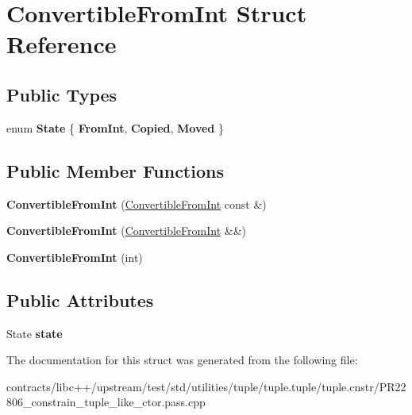 \hypertarget{struct_convertible_from_int}{}\section{Convertible\+From\+Int Struct Reference}
\label{struct_convertible_from_int}
\subsection*{Public Types}
\begin{DoxyCompactItemize}
\item 
\mbox{\label{struct_convertible_from_int_ac03fea24f2e5f41801003b27b999393c}} 
enum {\bfseries State} \{ {\bfseries From\+Int}, 
{\bfseries Copied}, 
{\bfseries Moved}
 \}
\end{DoxyCompactItemize}
\subsection*{Public Member Functions}
\begin{DoxyCompactItemize}
\item 
\mbox{\label{struct_convertible_from_int_a1fb13d3ae68c396a825090457729cc38}} 
{\bfseries Convertible\+From\+Int} (\mbox{\hyperlink{struct_convertible_from_int}{Convertible\+From\+Int}} const \&)
\item 
\mbox{\label{struct_convertible_from_int_a76fd3a33529e22331a478ac56dc66cfd}} 
{\bfseries Convertible\+From\+Int} (\mbox{\hyperlink{struct_convertible_from_int}{Convertible\+From\+Int}} \&\&)
\item 
\mbox{\label{struct_convertible_from_int_a15b206abf4ddc0338da9c98ed37e9743}} 
{\bfseries Convertible\+From\+Int} (int)
\end{DoxyCompactItemize}
\subsection*{Public Attributes}
\begin{DoxyCompactItemize}
\item 
\mbox{\label{struct_convertible_from_int_ad2c5c51ca07893f74d42e2ae7c6152c6}} 
State {\bfseries state}
\end{DoxyCompactItemize}


The documentation for this struct was generated from the following file\+:\begin{DoxyCompactItemize}
\item 
contracts/libc++/upstream/test/std/utilities/tuple/tuple.\+tuple/tuple.\+cnstr/P\+R22806\+\_\+constrain\+\_\+tuple\+\_\+like\+\_\+ctor.\+pass.\+cpp\end{DoxyCompactItemize}
